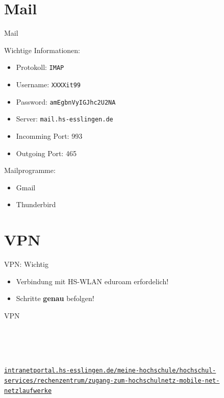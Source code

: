 \documentclass[10pt]{beamer}
\newcommand\urls[1]{%
  \href{https://#1}{\nolinkurl{#1}}%
}
\begin{document}
\section{Mail}

\begin{frame}{Mail}
    \begin{minipage} [t] {0.6\textwidth} 
        Wichtige Informationen:
        \begin{itemize}
            \item Protokoll: \texttt{IMAP}
            \item Username: \texttt{XXXXit99}
            \item Password: \texttt{amEgbnVyIGJhc2U2NA} %
            \item Server: \texttt{mail.hs-esslingen.de}
            \item Incomming Port: 993
            \item Outgoing Port: 465
        \end{itemize}
    \end{minipage}
    \begin{minipage} [t] {0.39\textwidth}
        Mailprogramme:
        \begin{itemize}
            \item Gmail \faMobile
            \item Thunderbird \faMobile~\faDesktop
        \end{itemize}
    \end{minipage}

    
\end{frame}

\section{VPN}

\begin{frame}{VPN: Wichtig}
    \Large
    \begin{itemize}
        \item[\faWarning] Verbindung mit HS-WLAN eduroam erfordelich!
        \item[\faWarning] Schritte \textbf{genau} befolgen!
    \end{itemize}
    

\end{frame}

\begin{frame}{VPN}
    \begin{figure}
        \centering
    \end{figure}
    \\~\\~

    \large
    \urls{intranetportal.hs-esslingen.de/meine-hochschule/hochschul-services/rechenzentrum/zugang-zum-hochschulnetz-mobile-net-netzlaufwerke}
\end{frame}
\end{document}
